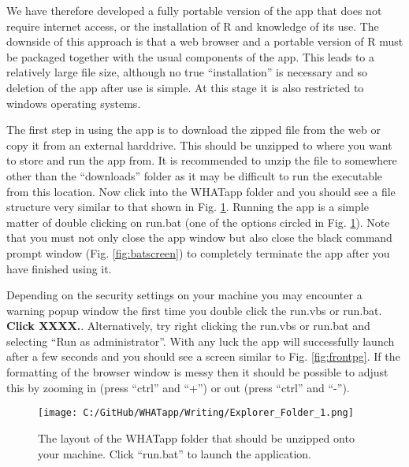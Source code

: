 \documentclass[11pt]{article}
\begin{document}
We have therefore developed a fully portable version of the app that does not require internet access, or the installation of R and knowledge of its use. The downside of this approach is that a web browser and a portable version of R must be packaged together with the usual components of the app. This leads to a relatively large file size, although  no true ``installation'' is necessary and so deletion of the app after use is simple. At this stage it is also restricted to windows operating systems. 

The first step in using the app is to download the zipped file from the web or copy it from an external harddrive. This should be unzipped to where you want to store and run the app from. It is recommended to unzip the file to somewhere other than the ``downloads'' folder as it may be difficult to run the executable from this location. Now click into the WHATapp folder and you should see a file structure very similar to that shown in Fig. \ref{fig:expl1screen}. Running the app is a simple matter of double clicking on run.bat (one of the options circled in Fig. \ref{fig:expl1screen}). Note that you must not only close the app window but also close the black command prompt window (Fig. \ref{fig:batscreen}) to completely terminate the app after you have finished using it.


Depending on the security settings on your machine you may encounter a warning popup window the first time you double click the run.vbs or run.bat. {\bf Click XXXX.}. Alternatively, try right clicking the run.vbs or run.bat and selecting ``Run as administrator''. With any luck the app will successfully launch after a few seconds and you should see a screen similar to Fig. \ref{fig:frontpg}. If the formatting of the browser window is messy then it should be possible to adjust this by zooming in (press ``ctrl'' and ``+'') or out (press ``ctrl'' and ``-'').

 \begin{figure} [h]
  \centering
\texttt{[image: C:/GitHub/WHATapp/Writing/Explorer\_Folder\_1.png]}
  \caption {The layout of the WHATapp folder that should be unzipped onto your machine. Click ``run.bat'' to launch the application.}
  \label{fig:expl1screen}
\end{figure}
\end{document}
